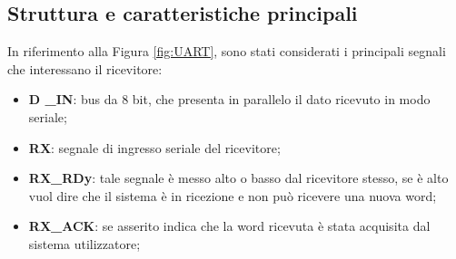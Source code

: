\documentclass[a4paper, titlepage]{article}
\begin{document}
\subsection{Struttura e caratteristiche principali}
In riferimento alla Figura \ref{fig:UART}, sono stati considerati i principali segnali che interessano il ricevitore:
\begin{itemize}
    \item \textbf{D \_IN}: bus da 8 bit, che presenta in parallelo il dato ricevuto in modo seriale;
    \item \textbf{RX}: segnale di ingresso seriale del ricevitore;
    \item \textbf{RX\_RDy}: tale segnale è messo alto o basso dal ricevitore stesso, se è alto vuol dire che il sistema è in ricezione e non può ricevere una nuova word;
    \item \textbf{RX\_ACK}: se asserito indica che la word ricevuta è stata acquisita dal sistema utilizzatore;
\end{itemize}
\newpage
\end{document}
